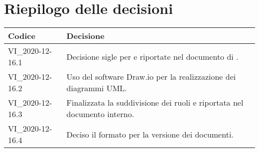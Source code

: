 \section{Riepilogo delle decisioni}
\setcounter{table}{-1}
{

\centering
\renewcommand{\arraystretch}{1.5}
\begin{longtable}{>{\centering}p{} >{}p{}}
\rowcolor{azzurro1}
\textbf{Codice} &
\centerline{\textbf{Decisione}}\\
\endhead

VI{\_}2020-12-16.1 & Decisione sigle per \AdR{} e riportate nel documento di \NdP{}. \\
VI{\_}2020-12-16.2 & Uso del software Draw.io per la realizzazione dei diagrammi UML. \\
VI{\_}2020-12-16.3 & Finalizzata la suddivisione dei ruoli e riportata nel documento interno.\\
VI{\_}2020-12-16.4 & Deciso il formato per la versione dei documenti.\\
\end{longtable}
}